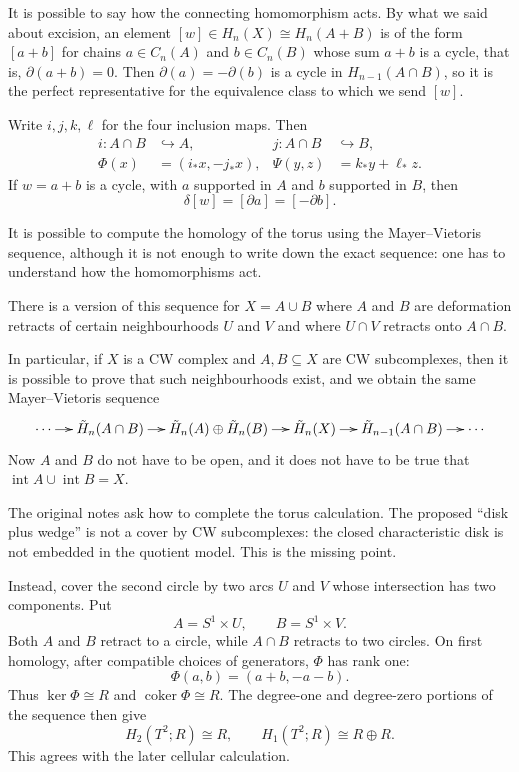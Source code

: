 It is possible to say how the connecting
homomorphism acts. By what
we said about excision, an element
$[w]\in H_n(X)\cong H_n(A+B)$ is of the form
$[a+b]$ for
chains $a\in C_n(A)$ and $b\in C_n(B)$ whose
sum $a+b$ is a
cycle, that is, $\partial(a+b)=0$. Then
$\partial(a)=-\partial(b)$ is a cycle in
$H_{n-1}(A\cap B)$,
so it is the perfect representative for the
equivalence class
to which we send $[w]$.

Write $i,j,k,\ell$ for the four inclusion
maps. Then
$$
\begin{aligned}
i:A\cap B&\hookrightarrow A,
&j:A\cap B&\hookrightarrow B,\\
\Phi(x)&=(i_*x,-j_*x),
&\Psi(y,z)&=k_*y+\ell_*z.
\end{aligned}
$$
If $w=a+b$ is a cycle, with $a$ supported
in $A$ and $b$ supported in $B$, then
$$
\delta[w]=[\partial a]=[-\partial b].
$$

\begin{example}
It is possible to compute the homology of the
torus using the
Mayer--Vietoris sequence, although it is not
enough to write
down the exact sequence: one has to
understand how the
homomorphisms act.
\end{example}

\begin{remark}
There is a version of this sequence for
$X=A\cup B$ where
$A$ and $B$ are deformation retracts of
certain
neighbourhoods $U$ and $V$ and where $U\cap
V$ retracts onto
$A\cap B$.

In particular, if $X$ is a CW complex and
$A,B\subseteq X$
are CW subcomplexes, then it is possible to
prove that such
neighbourhoods exist, and we obtain the same
Mayer--Vietoris
sequence
$$
\xymatrix@C=1.2em{
\cdots \ar[r]
 & \tilde H_n(A\cap B) \ar[r]
 & \tilde H_n(A)\oplus\tilde H_n(B)
   \ar[r]
 & \tilde H_n(X) \ar[r]
 & \tilde H_{n-1}(A\cap B) \ar[r]
 & \cdots
}
$$
Now $A$ and $B$ do not have to be open, and
it does not have
to be true that $\operatorname{int}
A\cup\operatorname{int} B=X$.
\end{remark}

\begin{example}
\label{example-torus-mayer-vietoris}
The original notes ask how to complete the
torus calculation. The proposed ``disk plus
wedge'' is not a cover by CW subcomplexes:
the
closed characteristic disk is not embedded in
the quotient model. This is the missing
point.

Instead, cover the second circle by two arcs
$U$ and $V$ whose intersection has two
components. Put
$$
A=S^1\times U,
\qquad
B=S^1\times V.
$$
Both $A$ and $B$ retract to a circle, while
$A\cap B$ retracts to two circles. On first
homology, after compatible choices of
generators, $\Phi$ has rank one:
$$
\Phi(a,b)=(a+b,-a-b).
$$
Thus $\ker\Phi\cong R$ and
$\operatorname{coker}\Phi\cong R$. The
degree-one and degree-zero portions of the
sequence then give
$$
H_2(T^2;R)\cong R,
\qquad
H_1(T^2;R)\cong R\oplus R.
$$
This agrees with the later cellular
calculation.
\end{example}


